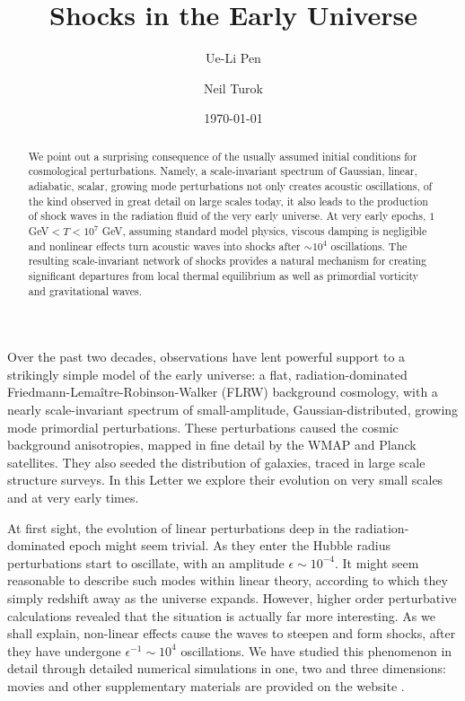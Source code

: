 \documentclass[prl,aps,10pt,twocolumn,showkeys,nofootinbib]{revtex4-1}
\begin{document}
\title{Shocks in the Early Universe}


\author{Ue-Li Pen }

\author{Neil Turok}


\date{\today}


\begin{abstract}
We point out a surprising consequence of the usually assumed initial conditions for cosmological perturbations. 
Namely, a scale-invariant spectrum of Gaussian, linear, adiabatic, scalar, growing mode perturbations not only creates acoustic oscillations, of the kind observed in great detail on large scales today, it also leads to the production of shock waves in the radiation fluid of the very early universe. At very early epochs, $1$ GeV$<T<10^{7}$ GeV, assuming standard model physics, viscous damping is negligible and nonlinear effects turn acoustic waves into shocks after $\sim 10^4$ oscillations. The resulting scale-invariant network of shocks provides a natural mechanism for creating significant departures from local thermal equilibrium as well as primordial vorticity and gravitational waves. 
\end{abstract}


\maketitle

Over the past two decades, observations have lent powerful support to a strikingly simple model of the early universe: a flat, radiation-dominated Friedmann-Lema\^{i}tre-Robinson-Walker (FLRW) background cosmology, with a nearly scale-invariant spectrum of small-amplitude, Gaussian-distributed, growing mode primordial perturbations. These perturbations caused the cosmic background anisotropies, mapped in fine detail by the WMAP and Planck satellites. They also seeded the distribution of galaxies, traced in large scale structure surveys. In this Letter we explore their evolution on very small scales and at very early times.  

At first sight, the evolution of linear perturbations deep in the radiation-dominated epoch might seem trivial. As they enter the Hubble radius perturbations start to oscillate, with an amplitude $\epsilon \sim10^{-4}$. It might seem reasonable to describe such modes within linear theory, according to which they simply redshift away as the universe expands. However, higher order perturbative calculations \cite{Gielen} revealed that the situation is actually far more interesting. As we shall explain, non-linear effects cause the waves to steepen and form shocks, after they have undergone $\epsilon^{-1} \sim 10^{4}$ oscillations. We have studied this phenomenon in detail through detailed numerical simulations in one, two and three dimensions: movies and other supplementary materials are provided on the website \cite{weblink}. 
\end{document}
